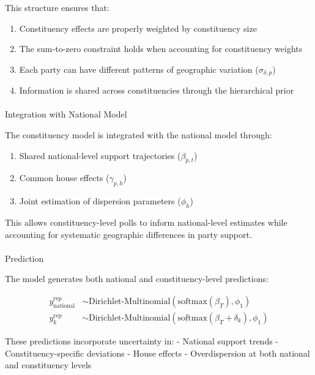 \documentclass[
  letterpaper,
  DIV=11,
  numbers=noendperiod]{scrartcl}
\makeatletter
\let\oldparagraph\paragraph
\renewcommand{\paragraph}{
    \@ifstar
      \xxxParagraphStar
      \xxxParagraphNoStar
  }
\newcommand{\xxxParagraphStar}[1]{\oldparagraph*{#1}\mbox{}}
\newcommand{\xxxParagraphNoStar}[1]{\oldparagraph{#1}\mbox{}}
\providecommand{\tightlist}{%
  \setlength{\itemsep}{0pt}\setlength{\parskip}{0pt}}\usepackage{longtable,booktabs,array}
\makeatother
\begin{document}
This structure ensures that:

\begin{enumerate}
\def\labelenumi{\arabic{enumi}.}
\tightlist
\item
  Constituency effects are properly weighted by constituency size
\item
  The sum-to-zero constraint holds when accounting for constituency
  weights
\item
  Each party can have different patterns of geographic variation
  (\(\sigma_{\delta,p}\))
\item
  Information is shared across constituencies through the hierarchical
  prior
\end{enumerate}

\paragraph{Integration with National
Model}\label{integration-with-national-model}

The constituency model is integrated with the national model through:

\begin{enumerate}
\def\labelenumi{\arabic{enumi}.}
\tightlist
\item
  Shared national-level support trajectories (\(\beta_{p,t}\))
\item
  Common house effects (\(\gamma_{p,h}\))
\item
  Joint estimation of dispersion parameters (\(\phi_h\))
\end{enumerate}

This allows constituency-level polls to inform national-level estimates
while accounting for systematic geographic differences in party support.

\paragraph{Prediction}\label{prediction}

The model generates both national and constituency-level predictions:

\[
\begin{aligned}
y^{\text{rep}}_{\text{national}} &\sim \text{Dirichlet-Multinomial}(\text{softmax}(\beta_T), \phi_1) \\
y^{\text{rep}}_{k} &\sim \text{Dirichlet-Multinomial}(\text{softmax}(\beta_T + \delta_k), \phi_1)
\end{aligned}
\]

These predictions incorporate uncertainty in: - National support trends
- Constituency-specific deviations - House effects - Overdispersion at
both national and constituency levels
\end{document}
